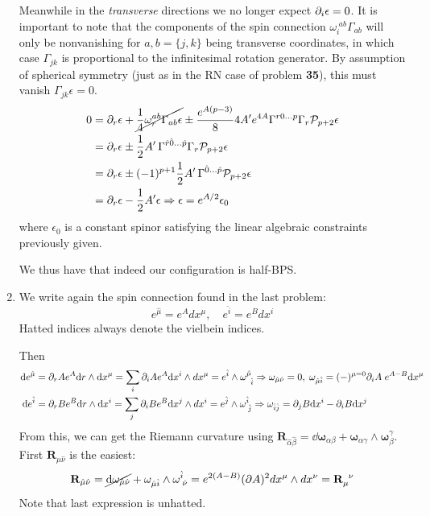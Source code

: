 \documentclass[11pt, class=article, crop=false]{standalone}
\begin{document}
\begin{enumerate}
	Meanwhile in the \emph{transverse} directions we no longer expect $\partial_i \epsilon = 0$. It is important to note that the components of the spin connection $\omega_{i}^{\; ab} \Gamma_{ab}$ will only be nonvanishing for $a, b = \{j, k\}$ being transverse coordinates, in which case $\Gamma_{jk}$ is proportional to the infinitesimal rotation generator. By assumption of spherical symmetry (just as in the RN case of problem \textbf{35}), this must vanish $\Gamma_{jk} \epsilon = 0$. 
	\[
	\begin{aligned}
		0 &= \partial_r \epsilon + \cancel{\frac14 \omega_r^{ab} \Gamma_{ab} \epsilon} \pm \frac{e^{A(p-3)}}{8} 4 A' e^{4A} \Gamma^{r 0 \dots p} \Gamma_r \mathcal P_{p+2} \epsilon\\
		&=  \partial_r \epsilon \pm  \frac12 A' \, \Gamma^{\hat r\hat 0 \dots \hat p} \Gamma_r \mathcal P_{p+2} \epsilon \\
		&= \partial_r \epsilon \pm  (-1)^{p+1} \frac12 A' \, \Gamma^{\hat 0 \dots \hat p} \mathcal P_{p+2} \epsilon\\
		&= \partial_r \epsilon - \frac12 A' \epsilon \Rightarrow \epsilon = e^{A/2} \epsilon_0
	\end{aligned}
	\]
	where $\epsilon_0$ is a constant spinor satisfying the linear algebraic constraints previously given.
	
	We thus have that indeed our configuration is half-BPS.

	\item We write again the spin connection found in the last problem:
	\[
		e^{\hat \mu} = e^A dx^\mu, \quad e^{\hat i} = e^B dx^{i}
	\]
	Hatted indices always denote the vielbein indices.
	
	Then
	\[
		\begin{aligned}
			\mathrm{d} e^{\hat \mu} &= \partial_r A e^{A} \mathrm{d} r \wedge \mathrm{d} x^\mu = \sum_i \partial_i A e^A \mathrm{d} x^i \wedge dx^\mu = e^{\hat i} \wedge \omega^{\hat \mu}_{\;\; \hat i} \Rightarrow  \omega_{\hat \mu \hat \nu} = 0, \; \omega_{\hat \mu \hat i} = (-)^{\mu=0} \partial_i A \; e^{A - B} \mathrm{d} x^\mu \\
			\mathrm{d} e^{\hat i} &= \partial_r B e^{B} \mathrm{d} r \wedge \mathrm{d} x^i = \sum_j \partial_i B e^B \mathrm{d} x^j \wedge dx^i = e^{\hat j} \wedge \omega^{\hat i}_{\; \hat j}
			\Rightarrow \omega_{\hat i \hat j} = \partial_j B \mathrm{d} x^i - \partial_i B \mathrm{d} x^j \\
		\end{aligned}
	\]
	From this, we can get the Riemann curvature using $\mathbf{R}_{\hat \alpha \hat \beta} = \dd \boldsymbol{\omega}_{\alpha \beta} + \boldsymbol{\omega}_{\alpha \gamma} \wedge \boldsymbol{\omega}^\gamma_\beta$. First $\mathbf{R}_{\hat \mu \hat \nu}$ is the easiest:
	\[
		\mathbf{R}_{\hat \mu \hat \nu} = \cancel{\mathrm{d} \omega_{\hat \mu \hat \nu}} + \omega_{\hat \mu \hat i} \wedge \omega^{\hat i}_{\; \hat \nu} = e^{2(A-B)} (\partial A)^2 dx^\mu \wedge dx^\nu = \mathbf{R}_{\mu}^{\;\; \nu}
	\]
	Note that last expression is unhatted. 
	

\end{enumerate}
\end{document}
